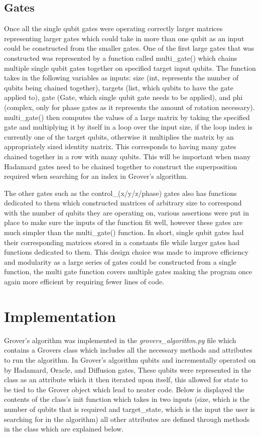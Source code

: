 \documentclass{article}
\begin{document}
\subsection{Gates}
Once all the single qubit gates were operating correctly larger matrices representing larger gates which could take in more than one qubit as an input could be constructed from the smaller gates. One of the first large gates that was constructed was represented by a function called multi\_gate() which chains multiple single qubit gates together on specified target input qubits. The function takes in the following variables as inputs: size (int, represents the number of qubits being chained together), targets (list, which qubits to have the gate applied to), gate (Gate, which single qubit gate needs to be applied), and phi (complex, only for phase gates as it represents the amount of rotation necessary). multi\_gate() then computes the values of a large matrix by taking the specified gate and multiplying it by itself in a loop over the input size, if the loop index is currently one of the target qubits, otherwise it multiplies the matrix by an appropriately sized identity matrix. This corresponds to having many gates chained together in a row with many qubits. This will be important when many Hadamard gates need to be chained together to construct the superposition required when searching for an index in Grover’s algorithm.

The other gates such as the control\_(x/y/z/phase) gates also has functions dedicated to them which constructed matrices of arbitrary size to correspond with the number of qubits they are operating on, various assertions were put in place to make sure the inputs of the function fit well, however these gates are much simpler than the multi\_gate() function. In short, single qubit gates had their corresponding matrices stored in a constants file while larger gates had functions dedicated to them. This design choice was made to improve efficiency and modularity as a large series of gates could be constructed from a single function, the multi gate function covers multiple gates making the program once again more efficient by requiring fewer lines of code.

\section{Implementation}

Grover's algorithm was implemented in the \textit{grovers\_algorithm.py} file which contains a Grovers class which includes all the necessary methods and attributes to run the algorithm. In Grover's algorithm qubits and incrementally operated on by Hadamard, Oracle, and Diffusion gates, These qubits were represented in the class as an attribute which it then iterated upon itself, this allowed for state to be tied to the Grover object which lead to neater code. Below is displayed the contents of the class's init function 
which takes in two inputs (size, which is the number of qubits that is required and target\_state, which is the input the user is searching for in the algorithm) all other attributes are defined through methods in the class which are explained below.
\end{document}
